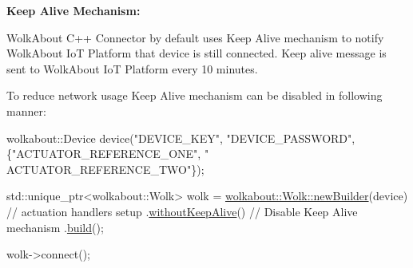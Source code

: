 {\bfseries Keep Alive Mechanism\+:}

Wolk\+About C++ Connector by default uses Keep Alive mechanism to notify Wolk\+About IoT Platform that device is still connected. Keep alive message is sent to Wolk\+About IoT Platform every 10 minutes.

To reduce network usage Keep Alive mechanism can be disabled in following manner\+:


\begin{DoxyCode}
wolkabout::Device device(\textcolor{stringliteral}{"DEVICE\_KEY"}, \textcolor{stringliteral}{"DEVICE\_PASSWORD"}, \{\textcolor{stringliteral}{"ACTUATOR\_REFERENCE\_ONE"}, \textcolor{stringliteral}{"
      ACTUATOR\_REFERENCE\_TWO"}\});

std::unique\_ptr<wolkabout::Wolk> wolk =
  \hyperlink{classwolkabout_1_1Wolk_a91270bb8552c2dee634e552111db4bb0}{wolkabout::Wolk::newBuilder}(device)
    \textcolor{comment}{// actuation handlers setup}
    .\hyperlink{classwolkabout_1_1WolkBuilder_a22893971f31f5dccb5dec0690324a038}{withoutKeepAlive}() \textcolor{comment}{// Disable Keep Alive mechanism}
    .\hyperlink{classwolkabout_1_1WolkBuilder_aad4c9b0c925a023cf670dc2fdc6631f3}{build}();

    wolk->connect();
\end{DoxyCode}
 